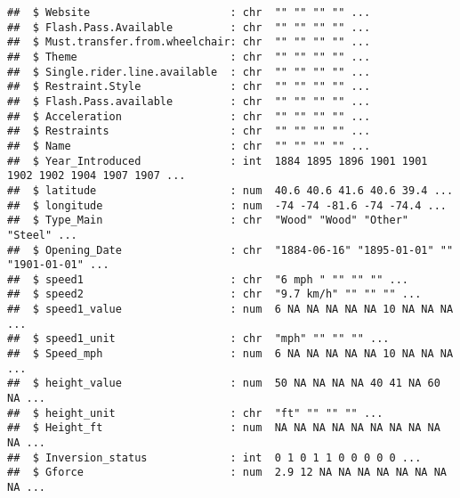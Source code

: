 \documentclass[
]{article}
\begin{document}
\begin{verbatim}
##  $ Website                      : chr  "" "" "" "" ...
##  $ Flash.Pass.Available         : chr  "" "" "" "" ...
##  $ Must.transfer.from.wheelchair: chr  "" "" "" "" ...
##  $ Theme                        : chr  "" "" "" "" ...
##  $ Single.rider.line.available  : chr  "" "" "" "" ...
##  $ Restraint.Style              : chr  "" "" "" "" ...
##  $ Flash.Pass.available         : chr  "" "" "" "" ...
##  $ Acceleration                 : chr  "" "" "" "" ...
##  $ Restraints                   : chr  "" "" "" "" ...
##  $ Name                         : chr  "" "" "" "" ...
##  $ Year_Introduced              : int  1884 1895 1896 1901 1901 1902 1902 1904 1907 1907 ...
##  $ latitude                     : num  40.6 40.6 41.6 40.6 39.4 ...
##  $ longitude                    : num  -74 -74 -81.6 -74 -74.4 ...
##  $ Type_Main                    : chr  "Wood" "Wood" "Other" "Steel" ...
##  $ Opening_Date                 : chr  "1884-06-16" "1895-01-01" "" "1901-01-01" ...
##  $ speed1                       : chr  "6 mph " "" "" "" ...
##  $ speed2                       : chr  "9.7 km/h" "" "" "" ...
##  $ speed1_value                 : num  6 NA NA NA NA NA 10 NA NA NA ...
##  $ speed1_unit                  : chr  "mph" "" "" "" ...
##  $ Speed_mph                    : num  6 NA NA NA NA NA 10 NA NA NA ...
##  $ height_value                 : num  50 NA NA NA NA 40 41 NA 60 NA ...
##  $ height_unit                  : chr  "ft" "" "" "" ...
##  $ Height_ft                    : num  NA NA NA NA NA NA NA NA NA NA ...
##  $ Inversion_status             : int  0 1 0 1 1 0 0 0 0 0 ...
##  $ Gforce                       : num  2.9 12 NA NA NA NA NA NA NA NA ...
\end{verbatim}
\end{document}
